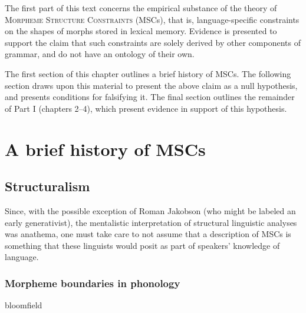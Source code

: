 \label{msc}

The first part of this text concerns the empirical substance of the theory of \textsc{Morpheme Structure Constraints} (MSCs), that is, language-specific constraints on the shapes of morphs stored in lexical memory.
Evidence is presented to support the claim that such constraints are solely derived by other components of grammar, and do not have an ontology of their own.

The first section of this chapter outlines a brief history of MSCs.
The following section draws upon this material to present the above claim as a null hypothesis, and presents conditions for falsifying it.
The final section outlines the remainder of Part I (chapters 2--4), which present evidence in support of this hypothesis.


\section{A brief history of MSCs}

\subsection{Structuralism}

Since, with the possible exception of Roman Jakobson (who might be labeled an early generativist), the mentalistic interpretation of structural linguistic analyses was anathema, one must take care to not assume that a description of MSCs is something that these linguists would posit as part of speakers' knowledge of language.

\subsubsection{Morpheme boundaries in phonology}

bloomfield


